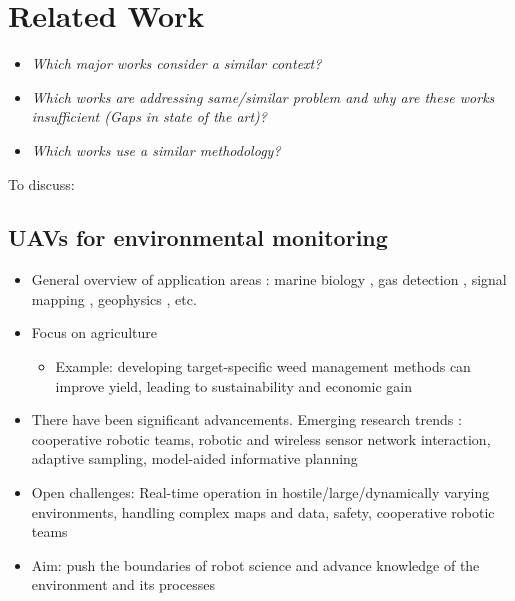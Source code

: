 \section{Related Work}
\label{S:related_work}

\begin{itemize}
	\item \emph{Which major works consider a similar context?}
	\item \emph{Which works are addressing same/similar problem and why are these works insufficient (Gaps in state of the art)?}
	\item \emph{Which works use a similar methodology?}
\end{itemize}

\hrulefill


To discuss:

\subsection{UAVs for environmental monitoring}

\begin{itemize}
 
 \item General overview of application areas \cite{Detweiler2015}: marine biology \cite{Hitz2015, Singh2010}, 
gas detection \cite{Marchant2014}, signal mapping \cite{Jadidi2016}, geophysics \cite{Muscato2012}, etc.
 
 \item Focus on agriculture \cite{Vivaldini2016, Anthony2014, Krienke2015} 
 \begin{itemize}
   \item Example: developing target-specific weed management methods can improve yield, leading to 
sustainability and economic gain \cite{Cardina1997}
 \end{itemize}
 
 \item There have been significant advancements. Emerging research trends \cite{Detweiler2015}: cooperative 
robotic teams, robotic and wireless sensor network interaction, adaptive sampling, model-aided informative 
planning
 \item Open challenges: Real-time operation in hostile/large/dynamically varying environments, handling 
complex maps and data, safety, cooperative robotic teams
 \item Aim: push the boundaries of robot science and advance knowledge of the environment and its processes

\end{itemize}

